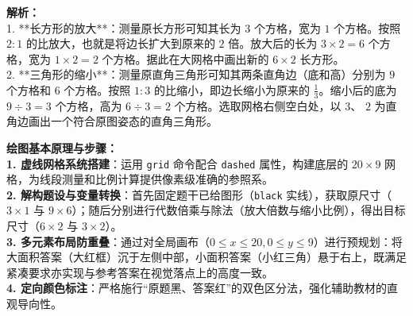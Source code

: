 \vspace{0.6cm}

{\small\color{gray}
\textbf{解析：}\\
1. **长方形的放大**：测量原长方形可知其长为 $3$ 个方格，宽为 $1$ 个方格。按照 $2:1$ 的比放大，也就是将边长扩大到原来的 $2$ 倍。放大后的长为 $3 \times 2 = 6$ 个方格，宽为 $1 \times 2 = 2$ 个方格。据此在大网格中画出新的 $6 \times 2$ 长方形。\\
2. **三角形的缩小**：测量原直角三角形可知其两条直角边（底和高）分别为 $9$ 个方格和 $6$ 个方格。按照 $1:3$ 的比缩小，即边长缩小为原来的 $\frac{1}{3}$。缩小后的底为 $9 \div 3 = 3$ 个方格，高为 $6 \div 3 = 2$ 个方格。选取网格右侧空白处，以 $3$、 $2$ 为直角边画出一个符合原图姿态的直角三角形。
}

\vspace{0.6cm}

{\small\color{blue!70!black}
\textbf{绘图基本原理与步骤：}\\
\textbf{1. 虚线网格系统搭建}：运用 \texttt{grid} 命令配合 \texttt{dashed} 属性，构建底层的 $20 \times 9$ 网格，为线段测量和比例计算提供像素级准确的参照系。\\
\textbf{2. 解构题设与变量转换}：首先固定题干已给图形（\texttt{black} 实线），获取原尺寸（$3\times 1$ 与 $9\times 6$）；随后分别进行代数倍乘与除法（放大倍数与缩小比例），得出目标尺寸（$6\times 2$ 与 $3\times 2$）。\\
\textbf{3. 多元素布局防重叠}：通过对全局画布（$0 \le x \le 20, 0 \le y \le 9$）进行预规划：将大面积答案（大红框）沉于左侧中部，小面积答案（小红三角）悬于右上，既满足紧凑要求亦实现与参考答案在视觉落点上的高度一致。\\
\textbf{4. 定向颜色标注}：严格施行“原题黑、答案红”的双色区分法，强化辅助教材的直观导向性。
}

\newpage
